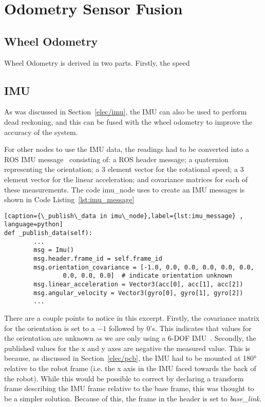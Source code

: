 \section{Odometry Sensor Fusion}\label{soft/odometry}

\subsection{Wheel Odometry}\label{soft/odometry/wheel}

Wheel Odometry is derived in two parts. Firstly, the speed


\subsection{IMU}\label{soft/odometry/imu}

As was discussed in Section~\ref{elec/imu}, the IMU can also be used to perform dead reckoning, and this can be fused with the wheel odometry to improve the accuracy of the system.

For other nodes to use the IMU data, the readings had to be converted into a ROS IMU message~\cite[std\_msgs/Imu]{RosDocs} consisting of: a ROS header message; a quaternion representing the orientation; a 3 element vector for the rotational speed; a 3 element vector for the linear acceleration; and covariance matrices for each of these measurements. The code imu\_node uses to create an IMU messages is shown in Code Listing~\ref{lst:imu_message}


\begin{lstlisting}[caption={\_publish\_data in imu\_node},label={lst:imu_message} , language=python]
def _publish_data(self):
        ...
        msg = Imu()
        msg.header.frame_id = self.frame_id
        msg.orientation_covariance = [-1.0, 0.0, 0.0, 0.0, 0.0, 0.0,
                0.0, 0.0, 0.0]  # indicate orientation unknown
        msg.linear_acceleration = Vector3(acc[0], acc[1], acc[2])
        msg.angular_velocity = Vector3(gyro[0], gyro[1], gyro[2])
        ...
\end{lstlisting}

There are a couple points to notice in this excerpt. Firstly, the covariance matrix for the orientation is set to a $-1$ followed by 0's. This indicates that values for the orientation are unknown as we are only using a 6-DOF IMU~\cite[std\_msgs/Imu]{RosDocs}. Secondly, the published values for the x and y axes are negative the measured value. This is because, as discussed in Section~\ref{elec/pcb}, the IMU had to be mounted at \ang{180} relative to the robot frame (i.e. the x axis in the IMU faced towards the back of the robot). While this would be possible to correct by declaring a transform frame describing the IMU frame relative to the base frame, this was thought to be a simpler solution. Because of this, the frame in the header is set to \textit{base\_link}.

